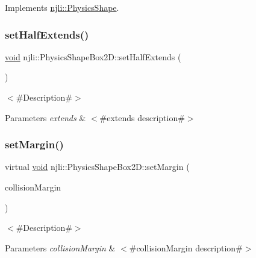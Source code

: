 Implements \mbox{\hyperlink{classnjli_1_1_physics_shape_a441e82a42f3b588a409c3b6c41288abd}{njli\+::\+Physics\+Shape}}.

\mbox{\label{classnjli_1_1_physics_shape_box2_d_aabb6127836224df169241021262fd609}} 
\subsubsection{\texorpdfstring{set\+Half\+Extends()}{setHalfExtends()}}
{\footnotesize\ttfamily \mbox{\hyperlink{_thread_8h_af1e856da2e658414cb2456cb6f7ebc66}{void}} njli\+::\+Physics\+Shape\+Box2\+D\+::set\+Half\+Extends (\begin{DoxyParamCaption}\item[{const bt\+Vector2 \&}]{ }\end{DoxyParamCaption})}

$<$\#\+Description\#$>$


\begin{DoxyParams}{Parameters}
{\em extends} & $<$\#extends description\#$>$ \\
\hline
\end{DoxyParams}
\mbox{\label{classnjli_1_1_physics_shape_box2_d_afe01bb58b54161763a144b4560161265}} 
\subsubsection{\texorpdfstring{set\+Margin()}{setMargin()}}
{\footnotesize\ttfamily virtual \mbox{\hyperlink{_thread_8h_af1e856da2e658414cb2456cb6f7ebc66}{void}} njli\+::\+Physics\+Shape\+Box2\+D\+::set\+Margin (\begin{DoxyParamCaption}\item[{bt\+Scalar}]{collision\+Margin }\end{DoxyParamCaption})\hspace{0.3cm}{\ttfamily [virtual]}}

$<$\#\+Description\#$>$


\begin{DoxyParams}{Parameters}
{\em collision\+Margin} & $<$\#collision\+Margin description\#$>$ \\
\hline
\end{DoxyParams}
\mbox{\label{classnjli_1_1_physics_shape_box2_d_ab37ca536b706f65c2321c9609ba2f462}} 
